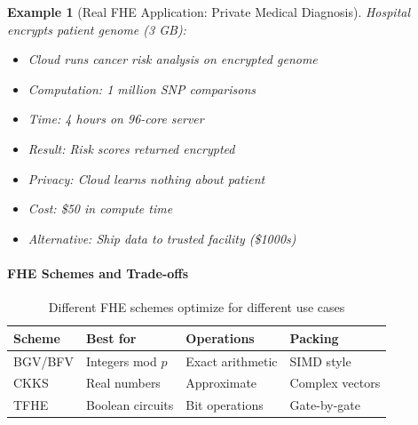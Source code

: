 \documentclass[11pt,a4paper]{article}
\newtheorem{example}{Example}
\begin{document}
\begin{example}[Real FHE Application: Private Medical Diagnosis]
Hospital encrypts patient genome (3 GB):
\begin{itemize}
    \item Cloud runs cancer risk analysis on encrypted genome
    \item Computation: 1 million SNP comparisons
    \item Time: 4 hours on 96-core server
    \item Result: Risk scores returned encrypted
    \item Privacy: Cloud learns nothing about patient
    \item Cost: \$50 in compute time
    \item Alternative: Ship data to trusted facility (\$1000s)
\end{itemize}
\end{example}

\paragraph{FHE Schemes and Trade-offs}

\begin{table}[h]
\centering
\begin{tabular}{|l|l|l|l|}
\hline
\textbf{Scheme} & \textbf{Best for} & \textbf{Operations} & \textbf{Packing} \\
\hline
BGV/BFV & Integers mod $p$ & Exact arithmetic & SIMD style \\
CKKS & Real numbers & Approximate & Complex vectors \\
TFHE & Boolean circuits & Bit operations & Gate-by-gate \\
\hline
\end{tabular}
\caption{Different FHE schemes optimize for different use cases}
\end{table}
\end{document}
